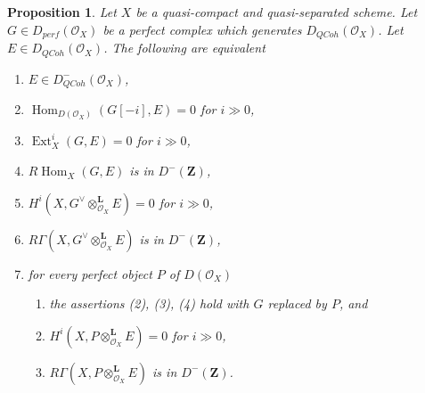 \documentclass{stacks-project}
\theoremstyle{plain}
\newtheorem{proposition}[subsection]{Proposition}
\theoremstyle{definition}
\theoremstyle{remark}
\numberwithin{equation}{subsection}
\def\Hom{\mathop{\mathrm{Hom}}\nolimits}
\def\Ext{\mathop{\mathrm{Ext}}\nolimits}
\def\QCoh{\mathit{QCoh}}
\begin{document}
\begin{proposition}
\label{proposition-detecting-bounded-above}
Let $X$ be a quasi-compact and quasi-separated scheme. Let
$G \in D_{perf}(\mathcal{O}_X)$ be a perfect complex which generates 
$D_\QCoh (\mathcal{O}_X)$. Let $E \in D_\QCoh (\mathcal{O}_X)$.
The following are equivalent
\begin{enumerate}
\item $E \in D^-_\QCoh (\mathcal{O}_X)$,
\item $\Hom_{D(\mathcal{O}_X)}(G[-i], E) = 0$ for $i \gg 0$,
\item $\Ext^i_X(G, E) = 0$ for $i \gg 0$,
\item $R\Hom_X(G, E)$ is in $D^-(\mathbf{Z})$,
\item $H^i(X, G^\vee \otimes_{\mathcal{O}_X}^\mathbf{L} E) = 0$
for $i \gg 0$,
\item $R\Gamma(X, G^\vee \otimes_{\mathcal{O}_X}^\mathbf{L} E)$
is in $D^-(\mathbf{Z})$,
\item for every perfect object $P$ of $D(\mathcal{O}_X)$
\begin{enumerate}
\item the assertions (2), (3), (4) hold with $G$ replaced by $P$, and
\item $H^i(X, P \otimes_{\mathcal{O}_X}^\mathbf{L} E) = 0$ for $i \gg 0$,
\item $R\Gamma(X, P \otimes_{\mathcal{O}_X}^\mathbf{L} E)$
is in $D^-(\mathbf{Z})$.
\end{enumerate}
\end{enumerate}
\end{proposition}
\end{document}
